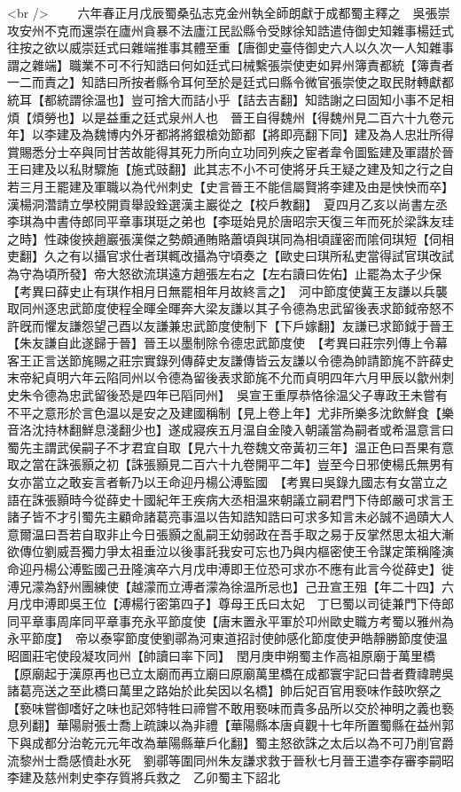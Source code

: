 <br />
　　六年春正月戊辰蜀桑弘志克金州執全師朗獻于成都蜀主釋之　吳張崇攻安州不克而還崇在廬州貪暴不法廬江民訟縣令受賕徐知誥遣侍御史知雜事楊廷式往按之欲以威崇廷式曰雜端推事其體至重【唐御史臺侍御史六人以久次一人知雜事謂之雜端】職業不可不行知誥曰何如廷式曰械繫張崇使吏如昇州簿責都統【簿責者一二而責之】知誥曰所按者縣令耳何至於是廷式曰縣令微官張崇使之取民財轉獻都統耳【都統謂徐温也】豈可捨大而詰小乎【詰去吉翻】知誥謝之曰固知小事不足相煩【煩勞也】以是益重之廷式泉州人也　晉王自得魏州【得魏州見二百六十九卷元年】以李建及為魏博内外牙都將將銀槍効節都【將即亮翻下同】建及為人忠壯所得賞賜悉分士卒與同甘苦故能得其死力所向立功同列疾之宦者韋令圖監建及軍譛於晉王曰建及以私財驟施【施式豉翻】此其志不小不可使將牙兵王疑之建及知之行之自若三月王罷建及軍職以為代州刺史【史言晉王不能信屬賢將李建及由是怏怏而卒】　漢楊洞濳請立學校開貢舉設銓選漢主巖從之【校戶教翻】　夏四月乙亥以尚書左丞李琪為中書侍郎同平章事琪珽之弟也【李珽始見於唐昭宗天復三年而死於梁誅友珪之時】性疎俊挾趙巖張漢傑之勢頗通賄賂蕭頃與琪同為相頃謹密而隂伺琪短【伺相吏翻】久之有以攝官求仕者琪輒改攝為守頃奏之【歐史曰琪所私吏當得試官琪改試為守為頃所發】帝大怒欲流琪遠方趙張左右之【左右讀曰佐佑】止罷為太子少保　【考異曰薛史止有琪作相月日無罷相年月故終言之】　河中節度使冀王友謙以兵襲取同州逐忠武節度使程全暉全暉奔大梁友謙以其子令德為忠武留後表求節鉞帝怒不許旣而懼友謙怨望己酉以友謙兼忠武節度使制下【下戶嫁翻】友謙已求節鉞于晉王【朱友謙自此遂歸于晉】晉王以墨制除令德忠武節度使　【考異曰莊宗列傳上令幕客王正言送節旄賜之莊宗實錄列傳薛史友謙傳皆云友謙以令德為帥請節旄不許薛史末帝紀貞明六年云陷同州以令德為留後表求節旄不允而貞明四年六月甲辰以歙州刺史朱令德為忠武留後恐是四年已䧟同州】　吳宣王重厚恭恪徐温父子專政王未嘗有不平之意形於言色温以是安之及建國稱制【見上卷上年】尤非所樂多沈飲鮮食【樂音洛沈持林翻鮮息淺翻少也】遂成寢疾五月温自金陵入朝議當為嗣者或希温意言曰蜀先主謂武侯嗣子不才君宜自取【見六十九卷魏文帝黃初三年】温正色曰吾果有意取之當在誅張顥之初【誅張顥見二百六十九卷開平二年】豈至今日邪使楊氏無男有女亦當立之敢妄言者斬乃以王命迎丹楊公溥監國　【考異曰吳錄九國志有女當立之語在誅張顥時今從薛史十國紀年王疾病大丞相温來朝議立嗣君門下侍郎嚴可求言王諸子皆不才引蜀先主顧命諸葛亮事温以告知誥知誥曰可求多知言未必誠不過賾大人意爾温曰吾若自取非止今日張顥之亂嗣王幼弱政在吾手取之易于反掌然思太祖大漸欲傳位劉威吾獨力爭太祖垂泣以後事託我安可忘也乃與内樞密使王令謀定策稱隆演命迎丹楊公溥監國己丑隆演卒六月戊申溥即王位恐可求亦不應有此言今從薛史】徙溥兄濛為舒州團練使【越濛而立溥者濛為徐温所忌也】己丑宣王殂【年二十四】六月戊申溥即吳王位【溥楊行密第四子】尊母王氏曰太妃　丁巳蜀以司徒兼門下侍郎同平章事周庠同平章事充永平節度使【唐末置永平軍於卭州歐史職方考蜀以雅州為永平節度】　帝以泰寜節度使劉鄩為河東道招討使帥感化節度使尹皓靜勝節度使温昭圖莊宅使段凝攻同州【帥讀曰率下同】　閏月庚申朔蜀主作高祖原廟于萬里橋【原廟起于漢原再也已立太廟而再立廟曰原廟萬里橋在成都寰宇記曰昔者費禕聘吳諸葛亮送之至此橋曰萬里之路始於此矣因以名橋】帥后妃百官用䙝味作鼓吹祭之【䙝味嘗御嗜好之味也記郊特牲曰禘嘗不敢用䙝味而貴多品所以交於神明之義也䙝息列翻】華陽尉張士喬上疏諫以為非禮【華陽縣本唐貞觀十七年所置蜀縣在益州郭下與成都分治乾元元年改為華陽縣華戶化翻】蜀主怒欲誅之太后以為不可乃削官爵流黎州士喬感憤赴水死　劉鄩等圍同州朱友謙求救于晉秋七月晉王遣李存審李嗣昭李建及慈州刺史李存質將兵救之　乙卯蜀主下詔北